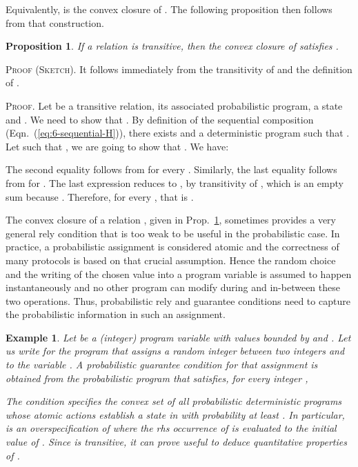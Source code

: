 \documentclass[review]{elsart}
\newtheorem{proposition}[definition]{Proposition}
\newtheorem{example}[definition]{Example}
\newenvironment{proof}{\par
\noindent
\textsc{Proof. }
\noindent}{\hfill}
\newenvironment{proofsummary}{\par
\noindent
\textsc{Proof (Sketch). }
\noindent}{\hfill}
\newcommand{\Eqn}[1]{Eqn.~(\ref{#1})}
\newcommand{\Prop}[1]{Prop.~\ref{#1}}
\begin{document}
Equivalently,  is the convex closure of . The following proposition then follows from that construction.
\begin{proposition}\label{pro:transitive-convex-closure}
If a relation  is transitive, then the convex closure  of  satisfies .
\end{proposition}

\begin{proofsummary}
It follows immediately from the transitivity of  and the definition of .
\end{proofsummary}

\begin{proof}
Let  be a transitive relation,  its associated probabilistic program,  a state and  . We need to show that . By definition of the sequential composition  (\Eqn{eq:6-sequential-H}), there exists  and a deterministic program  such that . Let  such that , we are going to show that . We have:

The second equality follows from  for every . Similarly, the last equality follows from  for . The last expression reduces to , by transitivity of , which is an empty sum because . Therefore,  for every , that is .
\end{proof}

The convex closure of a relation , given in \Prop{pro:transitive-convex-closure}, sometimes provides a very general rely condition that is too weak to be useful in the probabilistic case. In practice, a probabilistic assignment is considered atomic and the correctness of many protocols is based on that crucial assumption. Hence the random choice and the writing of the chosen value into a program variable  is assumed to happen instantaneously and no other program can modify  during and in-between these two operations. Thus, probabilistic rely and guarantee conditions need to capture the probabilistic information in such an assignment.

\begin{example} Let  be a (integer) program variable with values bounded by  and . Let us write  for the program that assigns a random integer between two integers  and  to the variable . A probabilistic guarantee condition for that assignment is obtained from the probabilistic program  that satisfies, for every integer ,
  
The condition  specifies the convex set of all probabilistic deterministic programs whose atomic actions establish a state in  with probability at least . In particular,  is an overspecification of   where the rhs occurrence of  is evaluated to the initial value of . Since  is transitive, it can prove useful to deduce quantitative properties of .  \end{example}
\end{document}
